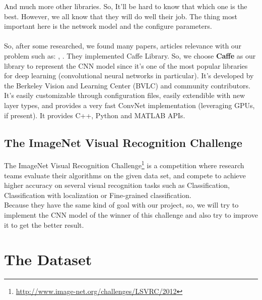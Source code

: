 \documentclass[hidelinks,12pt,a4paper]{report}
\begin{document}
And much more other libraries. So, It’ll be hard to know that which one is the best. However, we all know that they will do well their job. The thing most important here is the network model and the configure parameters. \\
\\
So, after some researched, we found many papers, articles relevance with our problem such as: \cite{placesdatabase}, \cite{landclassification}. They implemented Caffe Library. So, we choose \textbf{Caffe} as our library to represent the CNN model since it’s one of the most popular libraries for deep learning (convolutional neural networks in particular). It's developed by the Berkeley Vision and Learning Center (BVLC) and
community contributors. It’s easily customizable through configuration files, easily extendible with new layer types,
and provides a very fast ConvNet implementation (leveraging GPUs, if present). It provides C++, Python and MATLAB APIs.

\section{The ImageNet Visual Recognition Challenge}

The ImageNet Visual Recognition Challenge\footnote{\url{http://www.image-net.org/challenges/LSVRC/2012}} is a competition where research teams evaluate their algorithms on the given data set, and compete to achieve higher accuracy on several visual recognition tasks such as Classification, Classification with localization or Fine-grained classification. \\
Because they have the same kind of goal with our project, so, we will try to implement the CNN model of the winner of this challenge and also try to improve it to get the better result.

\chapter{The Dataset}



\end{document}
